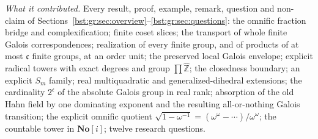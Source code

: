 \documentclass[11pt,letterpaper]{article}
\theoremstyle{definition}
\theoremstyle{remark}
\newcommand{\Z}{\mathbb Z}
\newcommand{\No}{\mathbf{No}}
\newcommand{\cc}{\mathfrak c}
\newcommand{\Zh}{\widehat{\Z}}
\begin{document}
\emph{What it contributed.} Every result, proof, example, remark, question
and non-claim of Sections~\ref{bst:gr:sec:overview}--\ref{bst:gr:sec:questions}:
the omnific fraction bridge and complexification; finite coset slices; the
transport of whole finite Galois correspondences; realization of every
finite group, and of products of at most $\cc$ finite groups, at an order
unit; the preserved local Galois envelope; explicit radical towers with
exact degrees and group $\prod\Zh$; the closedness boundary; an explicit
$S_m$ family; real multiquadratic and generalized-dihedral extensions; the
cardinality $2^{\cc}$ of the absolute Galois group in real rank; absorption
of the old Hahn field by one dominating exponent and the resulting
all-or-nothing Galois transition; the explicit omnific quotient
$\sqrt{1-\omega^{-1}}=(\omega^\omega-\cdots)/\omega^\omega$; the countable
tower in $\No[i]$; twelve research questions.
\end{document}
